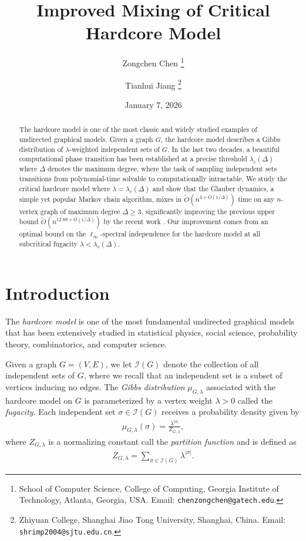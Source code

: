 \documentclass[11pt]{article}
\title{Improved Mixing of Critical Hardcore Model}
\author{Zongchen Chen \thanks{School of Computer Science, College of Computing, Georgia Institute of Technology, Atlanta, Georgia, USA. Email: \texttt{chenzongchen@gatech.edu}.} 
\and Tianhui Jiang \thanks{Zhiyuan College, Shanghai Jiao Tong University, Shanghai, China. Email: \texttt{shrimp2004@sjtu.edu.cn}.}}
\date{January 7, 2026}
\theoremstyle{plain}
\theoremstyle{definition}
\theoremstyle{remark}
\newcommand{\II}{\mathcal{I}}
\begin{document}
	
\maketitle
\thispagestyle{empty}
\begin{abstract}
	The hardcore model is one of the most classic and widely studied examples of undirected graphical models. Given a graph $G$, the hardcore model describes a Gibbs distribution of $\lambda$-weighted independent sets of $G$. In the last two decades, a beautiful computational phase transition has been established at a precise threshold $\lambda_c(\Delta)$ where $\Delta$ denotes the maximum degree, where the task of sampling independent sets transitions from polynomial-time solvable to computationally intractable. 
	We study the critical hardcore model where $\lambda = \lambda_c(\Delta)$
	and show that the Glauber dynamics, a simple yet popular Markov chain algorithm, mixes in $\tilde{O}(n^{4+O(1/\Delta)})$ time on any $n$-vertex graph of maximum degree $\Delta\geq3$, significantly improving the previous upper bound $\tilde{O}(n^{12.88+O(1/\Delta)})$ by the recent work \cite{CCYZ24}.
	Our improvement comes from an optimal bound on the $\ell_\infty$-spectral independence for the hardcore model at all subcritical fugacity $\lambda < \lambda_c(\Delta)$.
\end{abstract}
	
\newpage
	
\setcounter{page}{1}
	
\section{Introduction}

The \emph{hardcore model} is one of the most fundamental undirected graphical models that has been extensively studied in statistical physics, social science, probability theory, combinatorics, and computer science.

Given a graph $G=(V,E)$, we let $\II(G)$ denote the collection of all independent sets of $G$, where we recall that an independent set is a subset of vertices inducing no edges. 
The \emph{Gibbs distribution} $\mu_{G,\lambda}$ associated with the hardcore model on $G$ is parameterized by a vertex weight $\lambda > 0$ called the \emph{fugacity}. 
Each independent set $\sigma \in \II(G)$ receives a probability density given by
\begin{align*}
	\mu_{G,\lambda}(\sigma) = \frac{\lambda^{|\sigma|}}{Z_{G,\lambda}},
\end{align*}
where $Z_{G,\lambda}$ is a normalizing constant call the \emph{partition function} and is defined as
\begin{align*}
	Z_{G,\lambda} = \sum_{\sigma \in \II(G)} \lambda^{|\sigma|}.
\end{align*}
\end{document}
